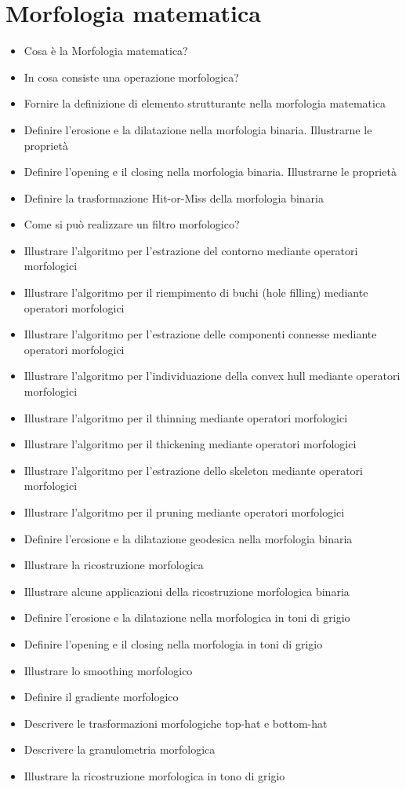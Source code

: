 \section{Morfologia matematica}
\begin{itemize}
	\item Cosa è la Morfologia matematica?
	\item In cosa consiste una operazione morfologica?
	\item Fornire la definizione di elemento strutturante nella morfologia matematica
	\item Definire l’erosione e la dilatazione nella morfologia binaria. Illustrarne le proprietà
	\item Definire l’opening e il closing nella morfologia binaria. Illustrarne le proprietà
	\item Definire la trasformazione Hit-or-Miss della morfologia binaria
	\item Come si può realizzare un filtro morfologico?
	\item Illustrare l’algoritmo per l’estrazione del contorno mediante operatori morfologici
	\item Illustrare l’algoritmo per il riempimento di buchi (hole filling) mediante operatori morfologici
	\item Illustrare l’algoritmo per l’estrazione delle componenti connesse mediante operatori morfologici
	\item Illustrare l’algoritmo per l’individuazione della convex hull mediante operatori morfologici
	\item Illustrare l’algoritmo per il thinning mediante operatori morfologici
	\item Illustrare l’algoritmo per il thickening mediante operatori morfologici
	\item Illustrare l’algoritmo per l’estrazione dello skeleton mediante operatori morfologici
	\item Illustrare l’algoritmo per il pruning mediante operatori morfologici
	\item Definire l’erosione e la dilatazione geodesica nella morfologia binaria
	\item Illustrare la ricostruzione morfologica
	\item Illustrare alcune applicazioni della ricostruzione morfologica binaria
	\item Definire l’erosione e la dilatazione nella morfologica in toni di grigio
	\item Definire l’opening e il closing nella morfologia in toni di grigio
	\item Illustrare lo smoothing morfologico
	\item Definire il gradiente morfologico
	\item Descrivere le trasformazioni morfologiche top-hat e bottom-hat
	\item Descrivere la granulometria morfologica
	\item Illustrare la ricostruzione morfologica in tono di grigio
\end{itemize}

